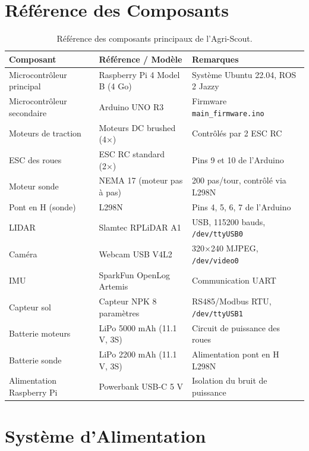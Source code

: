 \documentclass [12pt, a4paper]{article}
\begin{document}
\section{Référence des Composants}

\begin{table}[H]
\centering
\begin{tabularx}{\textwidth}{llX}
\toprule
\textbf{Composant} & \textbf{Référence / Modèle} & \textbf{Remarques} \\
\midrule
Microcontrôleur principal & Raspberry Pi 4 Model B (4 Go) & Système Ubuntu 22.04, ROS 2 Jazzy \\
Microcontrôleur secondaire & Arduino UNO R3 & Firmware \texttt{main\_firmware.ino} \\
Moteurs de traction & Moteurs DC brushed (4×) & Contrôlés par 2 ESC RC \\
ESC des roues & ESC RC standard (2×) & Pins 9 et 10 de l'Arduino \\
Moteur sonde & NEMA 17 (moteur pas à pas) & 200 pas/tour, contrôlé via L298N \\
Pont en H (sonde) & L298N & Pins 4, 5, 6, 7 de l'Arduino \\
LIDAR & Slamtec RPLiDAR A1 & USB, 115200 bauds, \texttt{/dev/ttyUSB0} \\
Caméra & Webcam USB V4L2 & 320×240 MJPEG, \texttt{/dev/video0} \\
IMU & SparkFun OpenLog Artemis & Communication UART \\
Capteur sol & Capteur NPK 8 paramètres & RS485/Modbus RTU, \texttt{/dev/ttyUSB1} \\
Batterie moteurs & LiPo 5000 mAh (11.1 V, 3S) & Circuit de puissance des roues \\
Batterie sonde & LiPo 2200 mAh (11.1 V, 3S) & Alimentation pont en H L298N \\
Alimentation Raspberry Pi & Powerbank USB-C 5 V & Isolation du bruit de puissance \\
\bottomrule
\end{tabularx}
\caption{Référence des composants principaux de l'Agri-Scout.}
\label{tab:composants}
\end{table}

\section{Système d'Alimentation}
\end{document}
